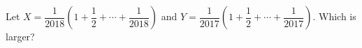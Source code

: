 Let $X=\dfrac1{2018}\left(1+\dfrac12+\cdots+\dfrac1{2018}\right)$ and $Y=\dfrac1{2017}\left(1+\dfrac12+\cdots+\dfrac1{2017}\right)$. Which is larger?
